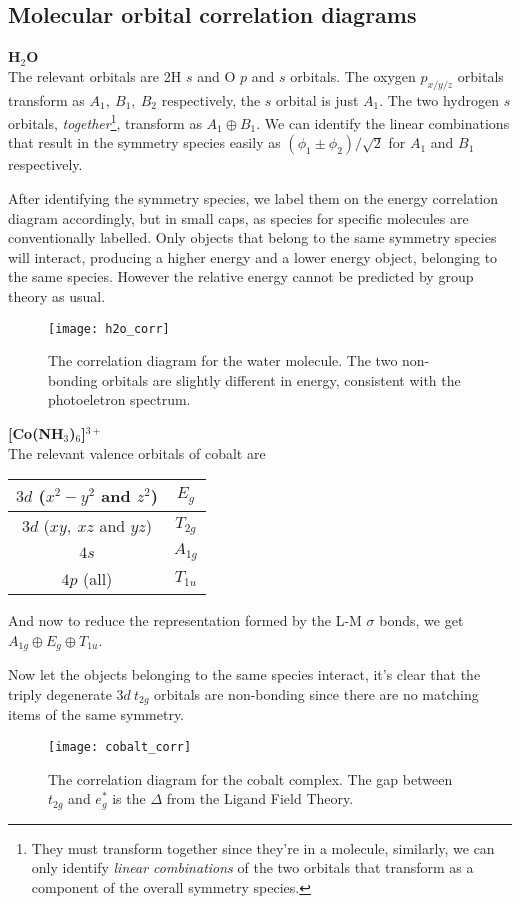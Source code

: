 \subsection{Molecular orbital correlation diagrams}
\textbf{H$_2$O}\\
The relevant orbitals are 2H $s$ and O $p$ and $s$ orbitals. 
The oxygen $p_{x/y/z}$ orbitals transform as $A_1,\ B_1,\ B_2$ respectively, 
the $s$ orbital is just $A_1$. 
The two hydrogen $s$ orbitals, \textit{together}\footnote{They must transform together since they're in a molecule, similarly, we can only identify \textit{linear combinations} of the two orbitals that transform as a component of the overall symmetry species.}, transform as $A_1\oplus B_1$. 
We can identify the linear combinations that result in the symmetry species easily as 
$(\phi_1\pm\phi_2)/\sqrt{2}$ for $A_1$ and $B_1$ respectively. \par
After identifying the symmetry species, we label them on the energy correlation diagram accordingly, but in small caps, as species for specific molecules are conventionally labelled. Only objects that belong to the same symmetry species will interact, producing a higher energy and a lower energy object, belonging to the same species. However the relative energy cannot be predicted by group theory as usual. 
\begin{figure}[H]
	\texttt{[image: h2o\_corr]}
	\centering
	\caption{The correlation diagram for the water molecule. The two non-bonding orbitals are slightly different in energy, consistent with the photoeletron spectrum.}
	\label{fig:h2o_corr}
\end{figure}
\textbf{[Co(NH$_3$)$_6$]$^{3+}$}\\
The relevant \ie valence orbitals of cobalt are
\begin{center}
	\begin{tabular}{c|c}
	$3d$ ($x^2-y^2$ and $z^2$) & $E_g$\\
	\hline
	$3d$ ($xy,\ xz$ and $yz$) & $T_{2g}$\\
	\hline
	$4s$ & $A_{1g}$\\
	\hline
	$4p$ (all) & $T_{1u}$
	\end{tabular}
\end{center}
And now to reduce the representation formed by the L-M $\sigma$ bonds, we get $A_{1g}\oplus E_g\oplus T_{1u}$. \par
Now let the objects belonging to the same species interact, it's clear that the triply degenerate $3d\ t_{2g}$ orbitals are non-bonding since there are no matching items of the same symmetry. 
\begin{figure}[H]
	\texttt{[image: cobalt\_corr]}
	\centering
	\caption{The correlation diagram for the cobalt complex. The gap between $t_{2g}$ and $e_g^*$ is the $\Delta$ from the Ligand Field Theory.}
	\label{fig:cobalt_corr}
\end{figure}
